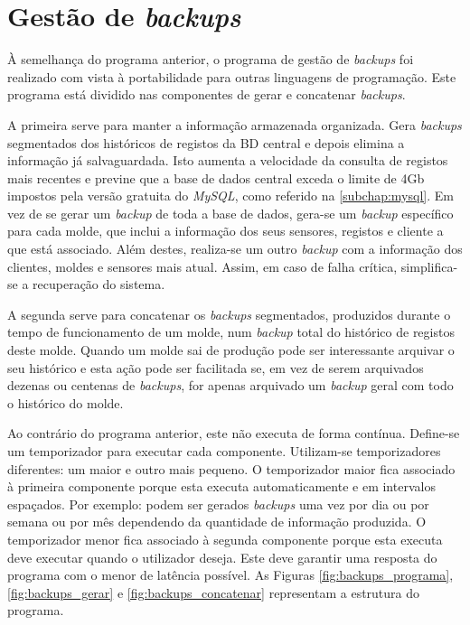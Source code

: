 \documentclass[11pt,twoside,a4paper]{report}
\begin{document}
\section{Gestão de \textit{backups}}
\label{subchap:backups}
À semelhança do programa anterior, o programa de gestão de \textit{backups} foi realizado com vista à portabilidade para outras linguagens de programação. Este programa está dividido nas componentes de gerar e concatenar \textit{backups}.\par 
A primeira serve para manter a informação armazenada organizada. Gera \textit{backups} segmentados dos históricos de registos da BD central e depois elimina a informação já salvaguardada. Isto aumenta a velocidade da consulta de registos mais recentes e previne que a base de dados central exceda o limite de 4Gb impostos pela versão gratuita do \textit{MySQL}, como referido na \autoref{subchap:mysql}. Em vez de se gerar um \textit{backup} de toda a base de dados, gera-se um \textit{backup} específico para cada molde, que inclui a informação dos seus sensores, registos e cliente a que está associado. Além destes, realiza-se um outro \textit{backup} com a informação dos clientes, moldes e sensores mais atual. Assim, em caso de falha crítica, simplifica-se a recuperação do sistema.\par 
A segunda serve para concatenar os \textit{backups} segmentados, produzidos durante o tempo de funcionamento de um molde, num \textit{backup} total do histórico de registos deste molde. Quando um molde sai de produção pode ser interessante arquivar o seu histórico e esta ação pode ser facilitada se, em vez de serem arquivados dezenas ou centenas de \textit{backups}, for apenas arquivado um \textit{backup} geral com todo o histórico do molde.\par 
Ao contrário do programa anterior, este não executa de forma contínua. Define-se um temporizador para executar cada componente. Utilizam-se temporizadores diferentes: um maior e outro mais pequeno. O temporizador maior fica associado à primeira componente porque esta executa automaticamente e em intervalos espaçados. Por exemplo: podem ser gerados \textit{backups} uma vez por dia ou por semana ou por mês dependendo da quantidade de informação produzida. O temporizador menor fica associado à segunda componente porque esta executa deve executar quando o utilizador deseja. Este deve garantir uma resposta do programa com o menor de latência possível.
As Figuras \ref{fig:backups_programa}, \ref{fig:backups_gerar} e \ref{fig:backups_concatenar} representam a estrutura do programa.\par 
\end{document}
